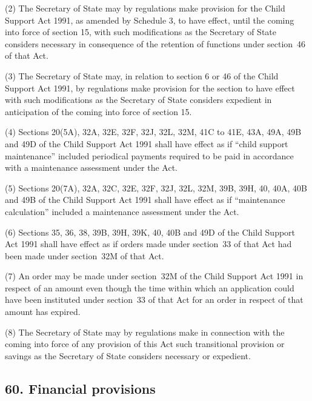 \documentclass[12pt,a4paper]{article}
\begin{document}

(2) The Secretary of State may by regulations make provision for the Child Support Act 1991, as amended by Schedule 3, to have effect, until the coming into force of section 15, with such modifications as the Secretary of State considers necessary in consequence of the retention of functions under section~46 of that Act.

(3) The Secretary of State may, in relation to section 6 or 46 of the Child Support Act 1991, by regulations make provision for the section to have effect with such modifications as the Secretary of State considers expedient in anticipation of the coming into force of section 15.

(4) Sections 20(5A), 32A, 32E, 32F, 32J, 32L, 32M, 41C to 41E, 43A, 49A, 49B and 49D of the Child Support Act 1991 shall have effect as if “child support maintenance” included periodical payments required to be paid in accordance with a maintenance assessment under the Act.

(5) Sections 20(7A), 32A, 32C, 32E, 32F, 32J, 32L, 32M, 39B, 39H, 40, 40A, 40B and 49B of the Child Support Act 1991 shall have effect as if “maintenance calculation” included a maintenance assessment under the Act.

(6) Sections 35, 36, 38, 39B, 39H, 39K, 40, 40B and 49D of the Child Support Act 1991 shall have effect as if orders made under section~33 of that Act had been made under section~32M of that Act.

(7) An order may be made under section~32M of the Child Support Act 1991 in respect of an amount even though the time within which an application could have been instituted under section~33 of that Act for an order in respect of that amount has expired.

(8) The Secretary of State may by regulations make in connection with the coming into force of any provision of this Act such transitional provision or savings as the Secretary of State considers necessary or expedient.


\subsection{60. Financial provisions}
\end{document}
